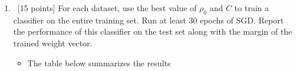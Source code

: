 \begin{enumerate}
\begin{itemize}
\begin{table}[!h]
\begin{tabular}{l | c | c | c | c | c}
\hline\hline
\end{tabular}
\end{table}

\end{itemize}

  
\item ~[15 points] For each dataset, use the best value of $\rho_0$
  and $C$ to train a classifier on the entire training set. Run at
  least 30 epochs of SGD. Report the performance of this classifier on
  the test set along with the margin of the trained weight vector.

\begin{itemize}
\item The table below summarizes the results


\end{itemize}
\end{enumerate}
